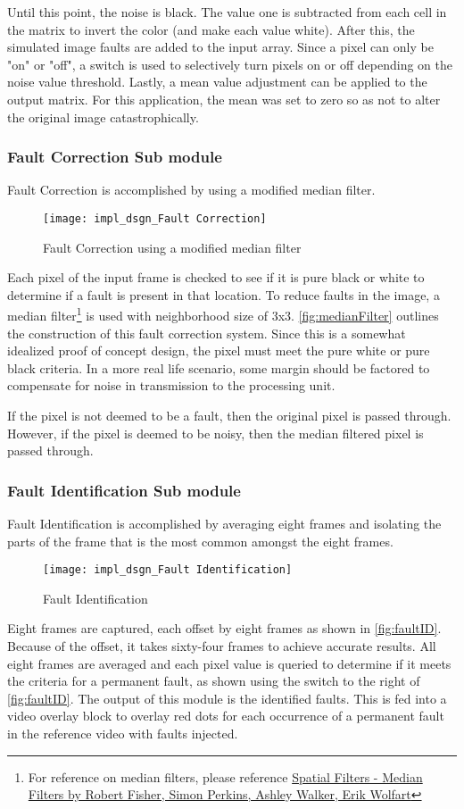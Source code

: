 \par Until this point, the noise is black. The value one is subtracted from each cell in the matrix to invert the color (and make each value white). After this, the simulated image faults are added to the input array. Since a pixel can only be "on" or "off", a switch is used to selectively turn pixels on or off depending on the noise value threshold. Lastly, a mean value adjustment can be applied to the output matrix. For this application, the mean was set to zero so as not to alter the original image catastrophically.

\subsubsection{Fault Correction Sub module}
Fault Correction is accomplished by using a modified median filter.
\begin{figure}[H]
    \texttt{[image: impl\_dsgn\_Fault Correction]}
    \caption{Fault Correction using a modified median filter}
    \label{fig:medianFilter}
\end{figure}
 \par Each pixel of the input frame is checked to see if it is pure black or white to determine if a fault is present in that location. To reduce faults in the image, a median filter\footnote{For reference on median filters, please reference \hyperlink{https://homepages.inf.ed.ac.uk/rbf/HIPR2/median.htm}{Spatial Filters - Median Filters by Robert Fisher, Simon Perkins, Ashley Walker, Erik Wolfart}} is used with neighborhood size of 3x3. \autoref{fig:medianFilter} outlines the construction of this fault correction system. Since this is a somewhat idealized proof of concept design, the pixel must meet the pure white or pure black criteria. In a more real life scenario, some margin should be factored to compensate for noise in transmission to the processing unit.
 \par If the pixel is not deemed to be a fault, then the original pixel is passed through. However, if the pixel is deemed to be noisy,  then the median filtered pixel is passed through.
 \subsubsection{Fault Identification Sub module}
 Fault Identification is accomplished by averaging eight frames and isolating the parts of the frame that is the most common amongst the eight frames.
 \begin{figure}[H]
    \texttt{[image: impl\_dsgn\_Fault Identification]}
    \caption{Fault Identification}
    \label{fig:faultID}
\end{figure}
Eight frames are captured, each offset by eight frames as shown in \autoref{fig:faultID}. Because of the offset, it takes sixty-four frames to achieve accurate results. All eight frames are averaged and each pixel value is queried to determine if it meets the criteria for a permanent fault, as shown using the switch to the right of \autoref{fig:faultID}. The output of this module is the identified faults. This is fed into a video overlay block to overlay red dots for each occurrence of a permanent fault in the reference video with faults injected.

